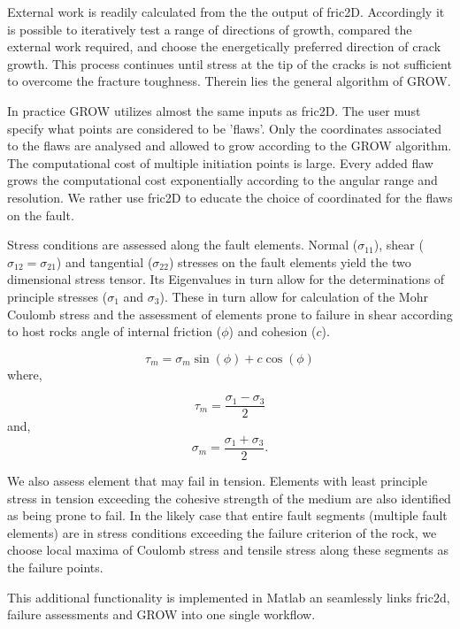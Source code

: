 \documentclass[12pt,a4paper]{article}
\begin{document}
External work is readily calculated from the the output of fric2D. Accordingly it is possible to iteratively test a range of directions of growth, compared the external work required, and choose the energetically preferred direction of crack growth. This process continues until stress at the tip of the cracks is not sufficient to overcome the fracture toughness. Therein lies the general algorithm of GROW. 

In practice GROW utilizes almost the same inputs as fric2D. The user must specify what points are considered to be 'flaws'. Only the coordinates associated to the flaws are analysed and allowed to grow according to the GROW algorithm. The computational cost of multiple initiation points is large. Every added flaw grows the computational cost exponentially according to the angular range and resolution. We rather use fric2D to educate the choice of coordinated for the flaws on the fault. 

Stress conditions are assessed along the fault elements. Normal ($\sigma_{11}$), shear ($\sigma_{12} = \sigma_{21}$) and tangential ($\sigma_22$) stresses on the fault elements yield the two dimensional stress tensor. Its Eigenvalues in turn allow for the determinations of principle stresses ($\sigma_1$ and $\sigma_3$). These in turn allow for calculation of the Mohr Coulomb stress and the assessment of elements prone to failure in shear according to host rocks angle of internal friction ($\phi$) and cohesion ($c$).

\begin{equation}
\tau_m = \sigma_m \sin(\phi) + c \cos(\phi)
\end{equation}
%
where,

\begin{equation}
\tau_m = \dfrac{\sigma_1-\sigma_3}{2}
\end{equation}
%
and,
\begin{equation}
\sigma_m = \dfrac{\sigma_1+\sigma_3}{2}.
\end{equation}

We also assess element that may fail in tension. Elements with least principle stress in tension exceeding the cohesive strength of the medium are also identified as being prone to fail. In the likely case that entire fault segments (multiple fault elements) are in stress conditions exceeding the failure criterion of the rock, we choose local maxima of Coulomb stress and tensile stress along these segments as the failure points.

This additional functionality is implemented in Matlab an seamlessly links fric2d, failure assessments and GROW into one single workflow.
\end{document}
